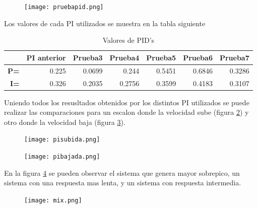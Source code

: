     \begin{figure}[htb]
    	\centering
    	\texttt{[image: pruebapid.png]}
    	\label{fig:PI3}
    \end{figure}
    
    Los valores de cada PI utilizados se muestra en la tabla siguiente
    \begin{table}[h]
    	\centering
    	\begin{tabular}{r|r|r|r|r|r|r|}
    		\cline{2-7}
    		\multicolumn{1}{l|}{} & \multicolumn{1}{c|}{\textbf{PI anterior}} & \multicolumn{1}{c|}{\textbf{Prueba3}} & \multicolumn{1}{c|}{\textbf{Prueba4}} & \multicolumn{1}{c|}{\textbf{Prueba5}} & \multicolumn{1}{c|}{\textbf{Prueba6}} & \multicolumn{1}{c|}{\textbf{Prueba7}} \\ \hline
    		\multicolumn{1}{|r|}{\textbf{P=}} & 0.225 & 0.0699 & 0.244 & 0.5451 & 0.6846 & 0.3286 \\ \hline
    		\multicolumn{1}{|r|}{\textbf{I=}} & 0.326 & 0.2035 & 0.2756 & 0.3599 & 0.4183 & 0.3107 \\ \hline
    	\end{tabular}
    \caption{Valores de PID's}
    \end{table}
    
    Uniendo todos los resusltados obtenidos por los distintos PI utilizados se puede realizar las comparaciones para un escalon donde la velocidad sube (figura \ref{fig:pisubuda}) y otro donde la velocidad baja (figura \ref{fig:pibajada}).
    
    \begin{figure}[h!]
    	\centering
    	\texttt{[image: pisubida.png]}
    	\label{fig:pisubuda}
    \end{figure}
    
    \begin{figure}[h!]
    	\centering
    	\texttt{[image: pibajada.png]}
    	\label{fig:pibajada}
    \end{figure}
    
    
    En la figura \ref{fig:mix} se pueden observar el sistema que genera mayor sobrepico, un sistema con una respuesta mas lenta, y un sistema con respuesta intermedia. 
    \begin{figure}[h!]
    	\centering
    	\texttt{[image: mix.png]}
    	\label{fig:mix}
    \end{figure}
    
    \newpage